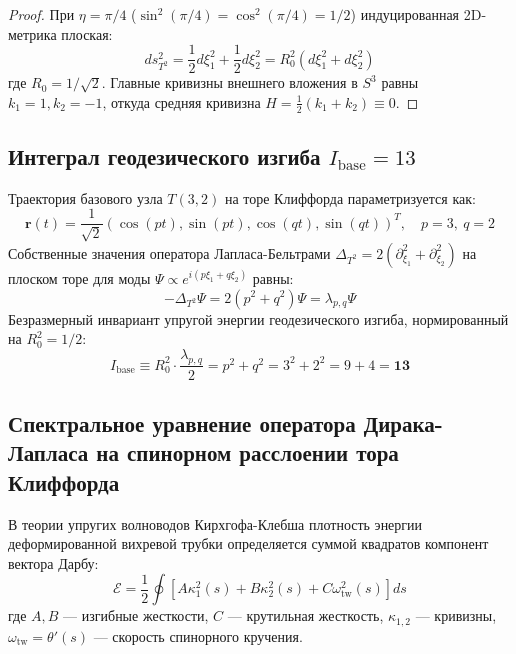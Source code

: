 \documentclass[12pt,a4paper]{article}
\begin{document}
	\begin{proof}
		При $\eta = \pi/4$ ($\sin^2(\pi/4) = \cos^2(\pi/4) = 1/2$) индуцированная 2D-метрика плоская:
		\begin{equation}
			ds^2_{T^2} = \frac{1}{2} d\xi_1^2 + \frac{1}{2} d\xi_2^2 = R_0^2 (d\xi_1^2 + d\xi_2^2)
		\end{equation}
		где $R_0 = 1/\sqrt{2}$. Главные кривизны внешнего вложения в $S^3$ равны $k_1 = 1, k_2 = -1$, откуда средняя кривизна $H = \frac{1}{2}(k_1 + k_2) \equiv 0$.
	\end{proof}
	
	\subsection{Интеграл геодезического изгиба $I_{\text{base}} = 13$}
	Траектория базового узла $T(3,2)$ на торе Клиффорда параметризуется как:
	\begin{equation}
		\mathbf{r}(t) = \frac{1}{\sqrt{2}} \left( \cos(pt), \sin(pt), \cos(qt), \sin(qt) \right)^T, \quad p=3, \ q=2
	\end{equation}
	Собственные значения оператора Лапласа-Бельтрами $\Delta_{T^2} = 2(\partial_{\xi_1}^2 + \partial_{\xi_2}^2)$ на плоском торе для моды $\Psi \propto e^{i(p\xi_1 + q\xi_2)}$ равны:
	\begin{equation}
		-\Delta_{T^2} \Psi = 2 (p^2 + q^2) \Psi = \lambda_{p,q} \Psi
	\end{equation}
	Безразмерный инвариант упругой энергии геодезического изгиба, нормированный на $R_0^2 = 1/2$:
	\begin{equation}
		I_{\text{base}} \equiv R_0^2 \cdot \frac{\lambda_{p,q}}{2} = p^2 + q^2 = 3^2 + 2^2 = 9 + 4 = \mathbf{13}
	\end{equation}
	
	\subsection{Спектральное уравнение оператора Дирака-Лапласа на спинорном расслоении тора Клиффорда}
	
	В теории упругих волноводов Кирхгофа-Клебша плотность энергии деформированной вихревой трубки определяется суммой квадратов компонент вектора Дарбу:
	\begin{equation}
		\mathcal{E} = \frac{1}{2} \oint \left[ A \kappa_1^2(s) + B \kappa_2^2(s) + C \omega_{\text{tw}}^2(s) \right] ds
	\end{equation}
	где $A, B$ — изгибные жесткости, $C$ — крутильная жесткость, $\kappa_{1,2}$ — кривизны, $\omega_{\text{tw}} = \theta'(s)$ — скорость спинорного кручения.
	
\end{document}
